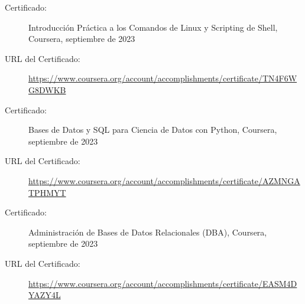 \documentclass[a4paper,10pt]{article}
\begin{document}
\begin{description}
    \item[Certificado:] Introducción Práctica a los Comandos de Linux y Scripting de Shell, Coursera, septiembre de 2023
    \item[URL del Certificado:] \url{https://www.coursera.org/account/accomplishments/certificate/TN4F6WG8DWKB}
\end{description}

\vspace{1pt} %

\begin{description}
    \item[Certificado:] Bases de Datos y SQL para Ciencia de Datos con Python, Coursera, septiembre de 2023
    \item[URL del Certificado:] \url{https://www.coursera.org/account/accomplishments/certificate/AZMNGATPHMYT}
\end{description}

\vspace{1pt} %

\begin{description}
    \item[Certificado:] Administración de Bases de Datos Relacionales (DBA), Coursera, septiembre de 2023
    \item[URL del Certificado:] \url{https://www.coursera.org/account/accomplishments/certificate/EASM4DYAZY4L}
\end{description}

\vspace{1pt} %
\end{document}
